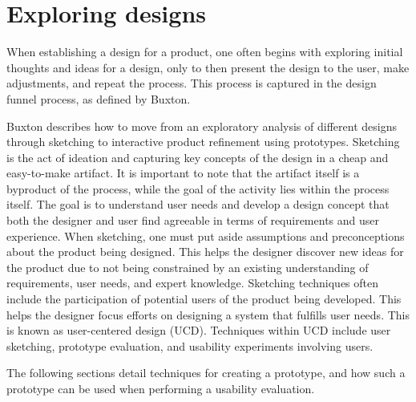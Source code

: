 \section{Exploring designs} %
When establishing a design for a product, one often begins with exploring initial thoughts and ideas for a design, only to then present the design to the user, make adjustments, and repeat the process. 
This process is captured in the design funnel process, as defined by Buxton\cite{BUXTON2007135_skething}.

Buxton\cite{BUXTON2007135_skething,BUXTON2007139_prototyping} describes how to move from an exploratory analysis of different designs through sketching to interactive product refinement using prototypes. 
Sketching is the act of ideation and capturing key concepts of the design in a cheap and easy-to-make artifact. 
It is important to note that the artifact itself is a byproduct of the process, while the goal of the activity lies within the process itself.\cite{BUXTON2007135_skething}
The goal is to understand user needs and develop a design concept that both the designer and user find agreeable in terms of requirements and user experience. 
When sketching, one must put aside assumptions and preconceptions about the product being designed.
This helps the designer discover new ideas for the product due to not being constrained by an existing understanding of requirements, user needs, and expert knowledge.
Sketching techniques often include the participation of potential users of the product being developed.
This helps the designer focus efforts on designing a system that fulfills user needs.
This is known as user-centered design (UCD). \cite{user-centred-design}
Techniques within UCD include user sketching, prototype evaluation, and usability experiments involving users.

The following sections detail techniques for creating a prototype, and how such a prototype can be used when performing a usability evaluation.